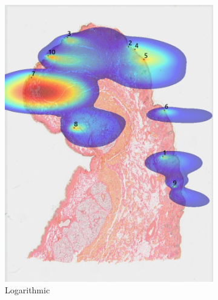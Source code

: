 \documentclass[a4paper,11pt]{report}
\numberwithin{figure}{section} %
\begin{document}
\begin{itemize}
\begin{figure}[H]
\begin{subfigure}[b]{0.19\textwidth}
            \includegraphics[width=\textwidth]{images/5501147_heatmap_ln.png}
            \caption{Logarithmic}
            \end{subfigure}
            \begin{subfigure}[b]{0.19\textwidth}

\end{subfigure}
\end{figure}
\end{itemize}
\end{document}

